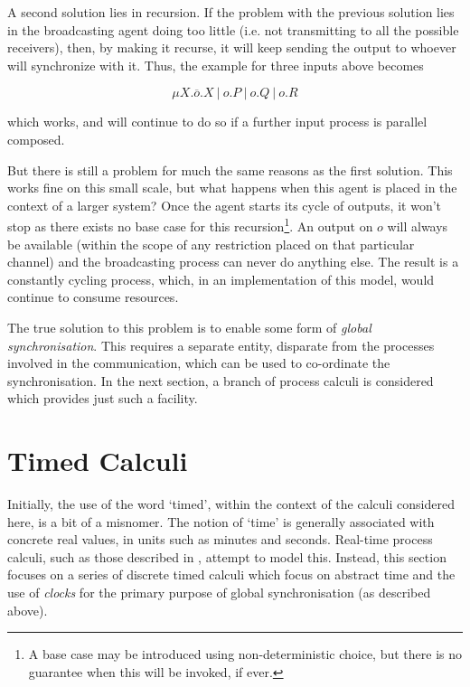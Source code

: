 A second solution lies in recursion.  If the problem with the previous
solution lies in the broadcasting agent doing too little (i.e. not
transmitting to all the possible receivers), then, by making it
recurse, it will keep sending the output to whoever will synchronize
with it.  Thus, the example for three inputs above becomes

\begin{equation}
\mu X.\overline{o}.X\ |\ o.P\ |\ o.Q\ |\ o.R
\end{equation}

\noindent which works, and will continue to do so if a further
input process is parallel composed.  

But there is still a problem for much the same reasons as the first
solution.  This works fine on this small scale, but what happens when
this agent is placed in the context of a larger system?  Once the agent
starts its cycle of outputs, it won't stop as there exists
no base case for this recursion\footnote{A base case may be introduced
using non-deterministic choice, but there is no guarantee when this will
be invoked, if ever.}.  An output on $o$ will always be available (within
the scope of any restriction placed on that particular channel) and
the broadcasting process can never do anything else.  The result is a
constantly cycling process, which, in an implementation of this model,
would continue to consume resources.

The true solution to this problem is to enable some form of
\emph{global synchronisation}.  This requires a separate entity,
disparate from the processes involved in the communication, which can
be used to co-ordinate the synchronisation.  In the next section, a
branch of process calculi is considered which provides just such a facility.

\section{Timed Calculi}
\label{timing}

Initially, the use of the word `timed', within the context of the
calculi considered here, is a bit of a misnomer.  The notion of `time'
is generally associated with concrete real values, in units such as
minutes and seconds.  Real-time process calculi, such as those
described in \cite{aceto:timing, beaten:timing, brics:lee, lee:realtime, tccs, satoh:phd, satoh:distrib}, attempt to model this.
Instead, this section focuses on a series of discrete timed calculi
which focus on abstract time and the use of \emph{clocks} for the
primary purpose of global synchronisation (as described above).

